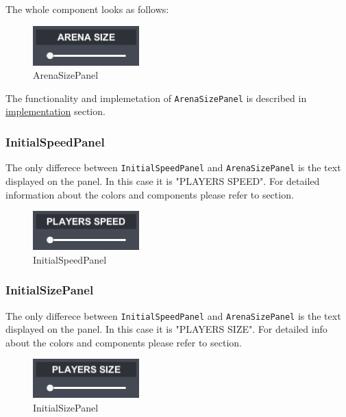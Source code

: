 \noindent The whole component looks as follows:
\begin{figure}[h] 
	\centering
	\includegraphics[scale=1, frame]{gui-imgs/arenasizepanel}
	\caption{ArenaSizePanel}
\end{figure}

\noindent The functionality and implemetation of \verb+ArenaSizePanel+ is described in \hyperref[gui-implementation]{implementation} section.

\subsubsection*{InitialSpeedPanel}\label{gui-initialspeedpanel}
\noindent The only differece between \verb+InitialSpeedPanel+ and \verb+ArenaSizePanel+ is the text displayed on the panel. In this case it is "PLAYERS SPEED". For detailed information about the colors and components please refer to  section.

\begin{figure}[h] 
	\centering
	\includegraphics[scale=1, frame]{gui-imgs/initialspeedpanel}
	\caption{InitialSpeedPanel}
\end{figure}

\subsubsection*{InitialSizePanel}\label{gui-initialsizepanel}
\noindent The only differece between \verb+InitialSpeedPanel+ and \verb+ArenaSizePanel+ is the text displayed on the panel. In this case it is "PLAYERS SIZE". For detailed info about the colors and components please refer to  section.

\begin{figure}[!h] 
	\centering
	\includegraphics[scale=1, frame]{gui-imgs/initialsizepanel}
	\caption{InitialSizePanel}
\end{figure}

